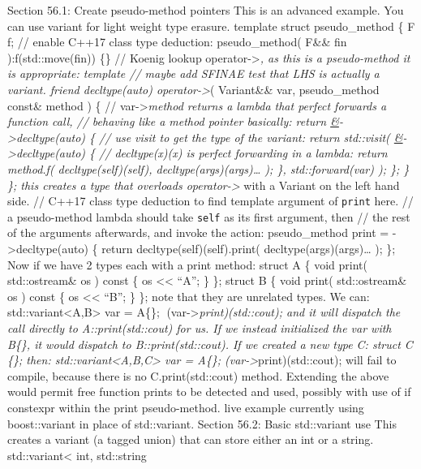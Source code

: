 Section 56.1: Create pseudo-method pointers This is an advanced example.
You can use variant for light weight type erasure. template struct
pseudo\_method \{ F f; // enable C++17 class type deduction:
pseudo\_method( F\&\& fin ):f(std::move(fin)) \{\} // Koenig lookup
operator-\textgreater{}\emph{, as this is a pseudo-method it is
appropriate: template // maybe add SFINAE test that LHS is actually a
variant. friend decltype(auto) operator-\textgreater{}}( Variant\&\&
var, pseudo\_method const\& method ) \{ //
var-\textgreater{}\emph{method returns a lambda that perfect forwards a
function call, // behaving like a method pointer basically: return
\href{auto\&\&...args}{\&}-\textgreater decltype(auto) \{ // use visit
to get the type of the variant: return std::visit(
\href{auto\&\&\%20self}{\&}-\textgreater decltype(auto) \{ //
decltype(x)(x) is perfect forwarding in a lambda: return method.f(
decltype(self)(self), decltype(args)(args)\ldots{} ); \},
std::forward(var) ); \}; \} \}; this creates a type that overloads
operator-\textgreater{}} with a Variant on the left hand side. // C++17
class type deduction to find template argument of
\passthrough{\lstinline!print!} here. // a pseudo-method lambda should
take \passthrough{\lstinline!self!} as its first argument, then // the
rest of the arguments afterwards, and invoke the action: pseudo\_method
print =
\href{auto\&\&\%20self,\%20auto\&\&...args}{}-\textgreater decltype(auto)
\{ return decltype(self)(self).print( decltype(args)(args)\ldots{} );
\}; Now if we have 2 types each with a print method: struct A \{ void
print( std::ostream\& os ) const \{ os \textless\textless{} ``A''; \}
\}; struct B \{ void print( std::ostream\& os ) const \{ os
\textless\textless{} ``B''; \} \}; note that they are unrelated types.
We can: std::variant\textless A,B\textgreater{} var = A\{\};
(var-\textgreater{}\emph{print)(std::cout); and it will dispatch the
call directly to A::print(std::cout) for us. If we instead initialized
the var with B\{\}, it would dispatch to B::print(std::cout). If we
created a new type C: struct C \{\}; then:
std::variant\textless A,B,C\textgreater{} var = A\{\};
(var-\textgreater{}}print)(std::cout); will fail to compile, because
there is no C.print(std::cout) method. Extending the above would permit
free function prints to be detected and used, possibly with use of if
constexpr within the print pseudo-method. live example currently using
boost::variant in place of std::variant. Section 56.2: Basic
std::variant use This creates a variant (a tagged union) that can store
either an int or a string. std::variant\textless{} int, std::string
